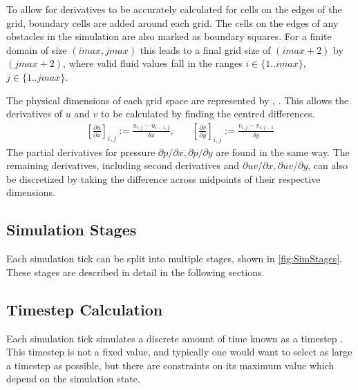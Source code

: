 To allow for derivatives to be accurately calculated for cells on the edges of the grid, boundary cells are added around each grid.%
The cells on the edges of any obstacles in the simulation are also marked as boundary squares.
For a finite domain of size $(imax, jmax)$ this leads to a final grid size of $(imax + 2)$ by $(jmax + 2)$, where valid fluid values fall in the ranges %
$i \in \{1..imax\}$, $j \in \{1..jmax\}$.

The physical dimensions of each grid space are represented by \deltaX{}, \deltaY{}.
This allows the derivatives of $u$ and $v$ to be calculated by finding the centred differences.
\begin{align}
    \left[\frac{\partial{u}}{\partial{x}}\right]_{i,j} := \frac{u_{i,j}-u_{i-1,j}}{\delta{x}}, 
    & \quad %
    \left[\frac{\partial{v}}{\partial{y}}\right]_{i,j} := \frac{v_{i,j}-v_{i,j-1}}{\delta{y}}
\end{align}
The partial derivatives for pressure $\partial{p}/\partial{x}, \partial{p}/\partial{y}$ are found in the same way.
The remaining derivatives, including second derivatives and $\partial{uv}/\partial{x}, \partial{uv}/\partial{y}$, can also be discretized by taking the difference across midpoints of their respective dimensions\cite{hirt1976}.
%

\subsection{Simulation Stages}

Each simulation tick can be split into multiple stages, shown in \cref{fig:SimStages}.
These stages are described in detail in the following sections.

\subsection{Timestep Calculation}
\label{sec:TimestepCalculation}
Each simulation tick simulates a discrete amount of time known as a timestep \deltaT{}.
This timestep is not a fixed value, and typically one would want to select as large a timestep as possible, but there are constraints on its maximum value which depend on the simulation state.

